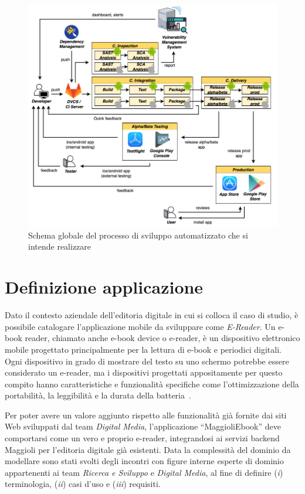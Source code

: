 \begin{figure}[H]
    \includegraphics[width=1\textwidth]{img/full-cicd.png}
    \caption{Schema globale del processo di sviluppo automatizzato che si intende realizzare}
    \label{full-cicd}
\end{figure}

\section{Definizione applicazione}
Dato il contesto aziendale dell'editoria digitale in cui si colloca il caso di studio,
è possibile catalogare l'applicazione mobile da sviluppare come \textit{E-Reader}. 
Un e-book reader, 
chiamato anche e-book device o e-reader, 
è un dispositivo elettronico mobile progettato principalmente per la lettura di e-book e periodici digitali. 
Ogni dispositivo in grado di mostrare del testo su uno schermo potrebbe essere considerato un e-reader, 
ma i dispositivi progettati appositamente per questo compito hanno caratteristiche e funzionalità specifiche come l'ottimizzazione della portabilità, 
la leggibilità e la durata della batteria~\cite{shoba2014vocabulary}.

Per poter avere un valore aggiunto rispetto alle funzionalità già fornite dai siti Web sviluppati dal team \textit{Digital Media},
l'applicazione ``MaggioliEbook'' deve comportarsi come un vero e proprio e-reader, 
integrandosi ai servizi backend Maggioli per l'editoria digitale già esistenti. 
Data la complessità del dominio da modellare sono stati svolti degli incontri con figure interne esperte di dominio appartenenti ai team \textit{Ricerca e Sviluppo} e \textit{Digital Media}, 
al fine di definire (\textit{i}) terminologia, 
(\textit{ii}) casi d'uso e (\textit{iii}) requisiti.

